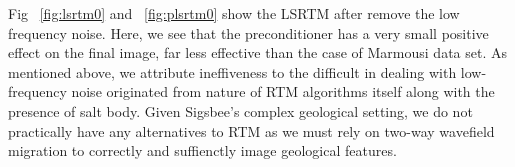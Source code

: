 
Fig ~\ref{fig:lsrtm0} and ~\ref{fig:plsrtm0} show the LSRTM after remove the low frequency noise. Here, we see that the preconditioner has a very small positive effect on the final image, far less effective than the case of Marmousi data set. As mentioned above, we attribute ineffiveness to the difficult in dealing with low-frequency noise originated from nature of RTM algorithms itself along with the presence of salt body. Given Sigsbee's complex geological setting, we do not practically have any alternatives to RTM as we must rely on two-way wavefield migration to correctly and suffienctly image geological features.